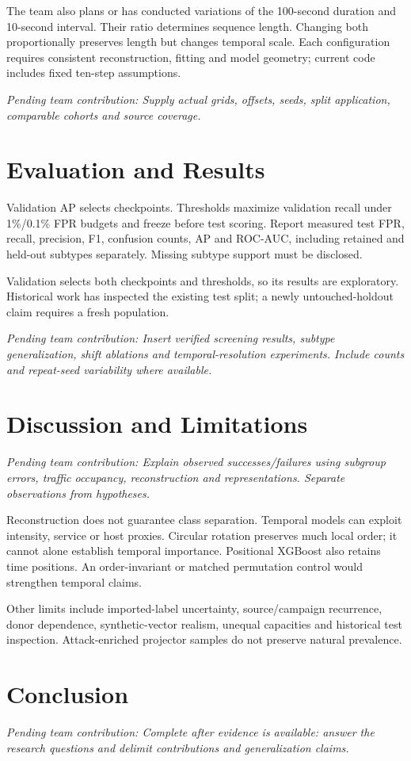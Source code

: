 \documentclass[conference]{IEEEtran}
\newcommand{\pending}[1]{\par\noindent\textit{Pending team contribution: #1}\par}
\begin{document}
The team also plans or has conducted variations of the 100-second duration and 10-second interval. Their ratio determines sequence length. Changing both proportionally preserves length but changes temporal scale. Each configuration requires consistent reconstruction, fitting and model geometry; current code includes fixed ten-step assumptions.
\pending{Supply actual grids, offsets, seeds, split application, comparable cohorts and source coverage.}

\section{Evaluation and Results}
Validation AP selects checkpoints. Thresholds maximize validation recall under 1\%/0.1\% FPR budgets and freeze before test scoring. Report measured test FPR, recall, precision, F1, confusion counts, AP and ROC-AUC, including retained and held-out subtypes separately. Missing subtype support must be disclosed.

Validation selects both checkpoints and thresholds, so its results are exploratory. Historical work has inspected the existing test split; a newly untouched-holdout claim requires a fresh population.
\pending{Insert verified screening results, subtype generalization, shift ablations and temporal-resolution experiments. Include counts and repeat-seed variability where available.}

\section{Discussion and Limitations}
\pending{Explain observed successes/failures using subgroup errors, traffic occupancy, reconstruction and representations. Separate observations from hypotheses.}
Reconstruction does not guarantee class separation. Temporal models can exploit intensity, service or host proxies. Circular rotation preserves much local order; it cannot alone establish temporal importance. Positional XGBoost also retains time positions. An order-invariant or matched permutation control would strengthen temporal claims.

Other limits include imported-label uncertainty, source/campaign recurrence, donor dependence, synthetic-vector realism, unequal capacities and historical test inspection. Attack-enriched projector samples do not preserve natural prevalence.

\section{Conclusion}
\pending{Complete after evidence is available: answer the research questions and delimit contributions and generalization claims.}
\end{document}

